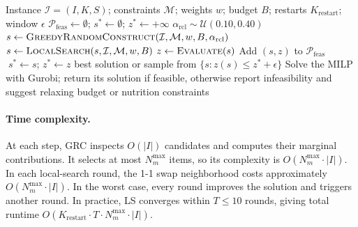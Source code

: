 \documentclass[a4paper]{article}
\begin{document}
\begin{algorithm}[H]
\caption{GRASP-LS for the Convenience Store Meal Recommendation Problem}
\label{alg:grasp}
\begin{algorithmic}[1]
\Require Instance $\mathcal{I}=(I,K,S)$; constraints $\mathcal{M}$; weights $w$; budget $B$; restarts $K_{\text{restart}}$; window $\epsilon$
\State $\mathcal{P}_{\mathrm{feas}}\gets\emptyset$; $s^* \gets \emptyset$; $z^* \gets +\infty$
  \State $\alpha_{\text{rcl}} \sim \mathcal{U}(0.10, 0.40)$
  \State $s \gets \textsc{GreedyRandomConstruct}(\mathcal{I},\mathcal{M},w,B,\alpha_{\text{rcl}})$
  \State $s \gets \textsc{LocalSearch}(s,\mathcal{I},\mathcal{M},w,B)$
  \State $z \gets \textsc{Evaluate}(s)$
      \State Add $(s,z)$ to $\mathcal{P}_{\mathrm{feas}}$
       $\;s^* \gets s$; $z^* \gets z$ \EndIf
  \EndIf
\EndFor
{}
    \State \Return best solution or sample from $\{s:z(s)\le z^*+\epsilon\}$
\Else
    \State Solve the MILP with Gurobi; return its solution if feasible, otherwise report infeasibility and suggest relaxing budget or nutrition constraints
\EndIf
\end{algorithmic}
\end{algorithm}

\paragraph{Time complexity.}At each step, GRC inspects $O(|I|)$ candidates and computes their marginal contributions. It selects at most $N^{\max}_m$ items, so its complexity is $O(N^{\max}_m\cdot |I|)$. In each local-search round, the 1-1 swap neighborhood costs approximately $O(N^{\max}_m\cdot |I|)$. In the worst case, every round improves the solution and triggers another round. In practice, LS converges within $T\le 10$ rounds, giving total runtime $O(K_{\text{restart}}\cdot T\cdot N^{\max}_m\cdot |I|)$.
\end{document}
